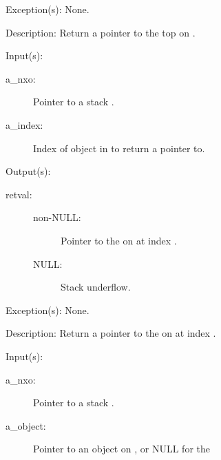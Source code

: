 \begin{capi}
\begin{capilist}
\begin{description}
\begin{description}
			\end{description}
		\end{description}
	\item[Exception(s): ] None.
	\item[Description: ]
		Return a pointer to the top  on .
	\end{capilist}
\label{nxo_stack_nget}
	\begin{capilist}
	\item[Input(s): ]
		\begin{description}\item[]
		\item[a\_nxo: ]
			Pointer to a stack .
		\item[a\_index: ]
			Index of object in  to return a pointer to.
		\end{description}
	\item[Output(s): ]
		\begin{description}\item[]
		\item[retval: ]
			\begin{description}\item[]
			\item[non-NULL: ]
				Pointer to the  on  at
				index .
			\item[NULL: ]
				Stack underflow.
			\end{description}
		\end{description}
	\item[Exception(s): ] None.
	\item[Description: ]
		Return a pointer to the  on  at index
		.
	\end{capilist}
\label{nxo_stack_down_get}
	\begin{capilist}
	\item[Input(s): ]
		\begin{description}\item[]
		\item[a\_nxo: ]
			Pointer to a stack \classname{nxo}.
		\item[a\_object: ]
			Pointer to an object on , or NULL for the

\end{description}
\end{capilist}
\end{capi}
